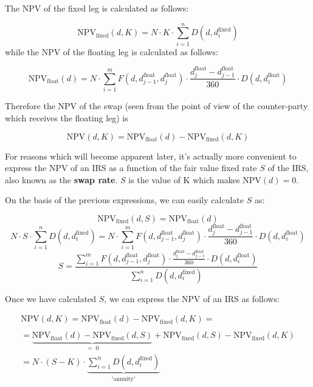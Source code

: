 The NPV of the fixed leg is calculated as follows:

\[\mathrm{NPV}_{\mathrm{fixed}}(d, K) = N\cdot K\cdot\sum_{i=1}^{n}D(d, d_{i}^{\mathrm{fixed}})\]
while the NPV of the floating leg is calculated as follows:

\[\mathrm{NPV}_{\mathrm{float}}(d) = N\cdot\sum_{i=1}^{m}F(d, d_{j-1}^{\mathrm{float}}, d_{j}^{\mathrm{float}}) \cdot \frac{d_{j}^{\mathrm{float}}-d_{j-1}^{\mathrm{float}}}{360}
\cdot D(d, d_{i}^{\mathrm{float}})\]

Therefore the NPV of the swap (seen from the point of view of the
counter-party which receives the floating leg) is

\[\mathrm{NPV}(d, K) = \mathrm{NPV}_{\mathrm{float}}(d) - \mathrm{NPV}_{\mathrm{fixed}}(d, K)\]

For reasons which will become apparent later, it's actually more
convenient to express the NPV of an IRS as a function of the fair value
fixed rate \(S\) of the IRS, also known as the \textbf{swap rate}. \(S\)
is the value of K which makes \(\mathrm{NPV}(d)=0\).

On the basis of the previous expressions, we can easily calculate \(S\)
as:

\[\mathrm{NPV}_{\mathrm{fixed}}(d, S) = \mathrm{NPV}_{\mathrm{float}}(d)\]
\[N\cdot S\cdot\sum_{i=1}^{n}D(d, d_{i}^{\mathrm{fixed}}) = N\cdot\sum_{i=1}^{m}F(d, d_{j-1}^{\mathrm{float}}, d_{j}^{\mathrm{float}}) \cdot \frac{d_{j}^{\mathrm{float}}-d_{j-1}^{\mathrm{float}}}{360} \cdot D(d, d_{i}^{\mathrm{float}})\]
\[S=\frac{\sum_{i=1}^{m}F(d, d_{j-1}^{\mathrm{float}}, d_{j}^{\mathrm{float}}) \cdot \frac{d_{j}^{\mathrm{float}}-d_{j-1}^{\mathrm{float}}}{360}
\cdot D(d, d_{i}^{\mathrm{float}})}{\sum_{i=1}^{n}D(d, d_i^{\mathrm{fixed}})} \]

Once we have calculated \(S\), we can express the \(\mathrm{NPV}\) of an
IRS as follows:

\begin{align*}&\mathrm{NPV}(d, K) = \mathrm{NPV}_{\mathrm{float}}(d) - \mathrm{NPV}_{\mathrm{fixed}}(d, K) = & \\ \\ &= \underbrace{\mathrm{NPV}_{\mathrm{float}}(d) - \mathrm{NPV}_{\mathrm{fixed}}(d, S)}_{\mathrm{=\;0}} + \mathrm{NPV}_{\mathrm{fixed}}(d, S) - \mathrm{NPV}_{\mathrm{fixed}}(d, K) & \\ & = N\cdot(S-K)\cdot\underbrace{\sum_{i=1}^{n}D(d, d_{i}^{\mathrm{fixed}})}_{\mathrm{'annuity'}}
\end{align*}

